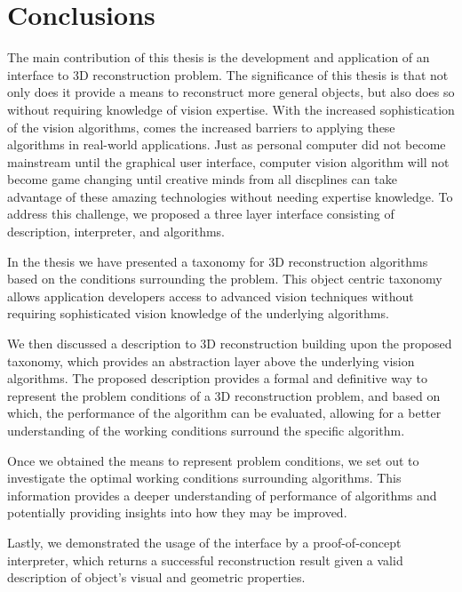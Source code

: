 
\chapter{Conclusions}
\label{ch:conclusion}
The main contribution of this thesis is the development and application of an interface to 3D reconstruction problem. The significance of this thesis is that not only does it provide a means to reconstruct more general objects, but also does so without requiring knowledge of vision expertise. With the increased sophistication of the vision algorithms, comes the increased barriers to applying these algorithms in real-world applications. Just as personal computer did not become mainstream until the graphical user interface, computer vision algorithm will not become game changing until creative minds from all discplines can take advantage of these amazing technologies without needing expertise knowledge. To address this challenge, we proposed a three layer interface consisting of description, interpreter, and algorithms.

In the thesis we have presented a taxonomy for 3D reconstruction algorithms based on the conditions surrounding the problem. This object centric taxonomy allows application developers access to advanced vision techniques without requiring sophisticated vision knowledge of the underlying algorithms.

We then discussed a description to 3D reconstruction building upon the proposed taxonomy, which provides an abstraction layer above the underlying vision algorithms. The proposed description provides a formal and definitive way to represent the problem conditions of a 3D reconstruction problem, and based on which, the performance of the algorithm can be evaluated, allowing for a better understanding of the working conditions surround the specific algorithm. 

Once we obtained the means to represent problem conditions, we set out to investigate the optimal working conditions surrounding algorithms. This information provides a deeper understanding of performance of algorithms and potentially providing insights into how they may be improved. 

Lastly, we demonstrated the usage of the interface by a proof-of-concept interpreter, which returns a successful reconstruction result given a valid description of object's visual and geometric properties.

